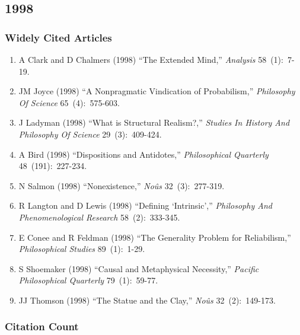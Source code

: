 \documentclass[
  10pt,
  letterpaper,
  DIV=11,
  numbers=noendperiod,
  twoside]{scrartcl}
\providecommand{\tightlist}{%
  \setlength{\itemsep}{0pt}\setlength{\parskip}{0pt}}\usepackage{longtable,booktabs,array}
\begin{document}
\newpage

\subsection{1998}\label{sec-s1998}

\subsubsection*{Widely Cited Articles}\label{widely-cited-articles-42}

\begin{enumerate}
\def\labelenumi{\arabic{enumi}.}
\tightlist
\item
  A Clark and D Chalmers (1998) ``The Extended Mind,'' \emph{Analysis}
  58~(1):~7-19.
\item
  JM Joyce (1998) ``A Nonpragmatic Vindication of Probabilism,''
  \emph{Philosophy Of Science} 65~(4):~575-603.
\item
  J Ladyman (1998) ``What is Structural Realism?,'' \emph{Studies In
  History And Philosophy Of Science} 29~(3):~409-424.
\item
  A Bird (1998) ``Dispositions and Antidotes,'' \emph{Philosophical
  Quarterly} 48~(191):~227-234.
\item
  N Salmon (1998) ``Nonexistence,'' \emph{Noûs} 32~(3):~277-319.
\item
  R Langton and D Lewis (1998) ``Defining `Intrinsic',''
  \emph{Philosophy And Phenomenological Research} 58~(2):~333-345.
\item
  E Conee and R Feldman (1998) ``The Generality Problem for
  Reliabilism,'' \emph{Philosophical Studies} 89~(1):~1-29.
\item
  S Shoemaker (1998) ``Causal and Metaphysical Necessity,''
  \emph{Pacific Philosophical Quarterly} 79~(1):~59-77.
\item
  JJ Thomson (1998) ``The Statue and the Clay,'' \emph{Noûs}
  32~(2):~149-173.
\end{enumerate}

\subsubsection*{Citation Count}\label{sec-count-1998}
\end{document}
